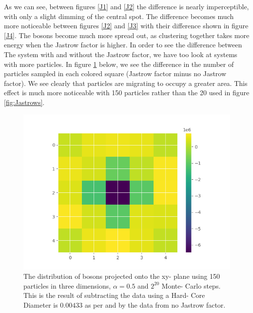 \documentclass[11pt,a4paper,titlepage]{article}
\begin{document}
As we can see, between figures \ref{J1} and \ref{J2} the difference is nearly imperceptible, with only a slight dimming of the central spot. The difference becomes much more noticeable between figures \ref{J2} and \ref{J3} with their difference shown in figure \ref{J4}. The bosons become much more spread out, as clustering together takes more energy when the Jastrow factor is higher. In order to see the difference between The system with and without the Jastrow factor, we have too look at systems with more particles. In figure \ref{150Particles_Jastrow_minus_NoJastrow} below, we see the difference in the number of particles sampled in each colored square (Jastrow factor minus no Jastrow factor). We see clearly that particles are migrating to occupy a greater area. This effect is much more noticeable with 150 particles rather than the 20 used in figure \ref{fig:Jastrows}.

\begin{figure}[H]
\centering

\includegraphics[trim=0cm 0.0cm 0cm 0.0cm, clip=true,scale = 0.5]{Jastrow_minus_NoJastrow_150.png}
\caption[]{The distribution of bosons projected onto the xy- plane using 150 particles in three dimensions, $\alpha = 0.5$ and $2^{20}$ Monte- Carlo steps. This is the result of subtracting the data using a Hard- Core Diameter is $0.00433$ as per \cite{DuBois_2001} and \cite{Nilsen_2005} by the data from no Jastrow factor.}\label{150Particles_Jastrow_minus_NoJastrow}
\end{figure}
\end{document}
